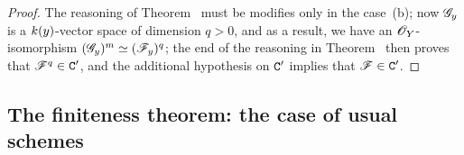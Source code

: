 \begin{proof}
\label{proof-3.3.1.3}
The reasoning of Theorem~ must be modifies only in the case~(b); now $\mathscr{G}_y$ is a $k(y)$-vector space of dimension $q>0$, and as a result, we have an $\mathscr{O}_Y$-isomorphism $(\mathscr{G}_y)^m\simeq(\mathscr{F}_y)^q$; the end of the reasoning in Theorem~ then proves that $\mathscr{F}^q\in\mathtt{C}'$, and the additional hypothesis on $\mathtt{C}'$ implies that $\mathscr{F}\in\mathtt{C}'$.
\end{proof}

\subsection{The finiteness theorem: the case of usual schemes}
\label{subsection:finiteness-theorem-usual-case}

